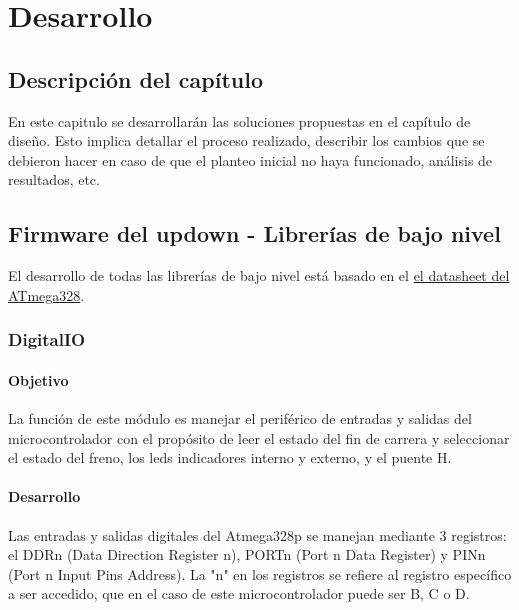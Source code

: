 \chapter{Desarrollo}
\thispagestyle{empty}

\section{Descripción del capítulo} \label{sec:\thesection}
En este capitulo se desarrollarán las soluciones propuestas en el capítulo de diseño. Esto implica detallar el proceso realizado, describir los cambios que se debieron hacer en caso de que el planteo inicial no haya funcionado, análisis de resultados, etc.

\section{Firmware del updown - Librerías de bajo nivel} \label{sec:\thesection}
El desarrollo de todas las librerías de bajo nivel está basado en el \href{http://www.atmel.com/Images/Atmel-42735-8-bit-AVR-Microcontroller-ATmega328-328P_Datasheet.pdf}{el datasheet del ATmega328}.

\subsection{DigitalIO}
\subsubsection{Objetivo}
La función de este módulo es manejar el periférico de entradas y salidas del microcontrolador con el propósito de leer el estado del fin de carrera y seleccionar el estado del freno, los leds indicadores interno y externo, y el puente H.

\subsubsection{Desarrollo}
Las entradas y salidas digitales del Atmega328p se manejan mediante 3 registros: el DDRn (Data Direction Register n), PORTn (Port n Data Register) y PINn (Port n Input Pins Address). La "n" en los registros se refiere al registro específico a ser accedido, que en el caso de este microcontrolador puede ser B, C o D.

